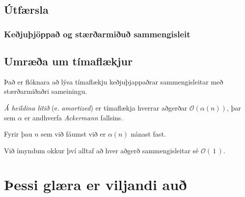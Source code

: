 \subsection{Útfærsla}
{
	\frametitle{Keðjuþjöppað og stærðarmiðuð sammengisleit}
}

\subsection{Umræða um tímaflækjur}
{
	{
		\item<1-> Það er flóknara að lýsa tímaflækju keðjuþjappaðrar sammengisleitar með stærðarmiðaðri sameiningu.
		\item<2-> \emph{Á heildina litið} (e. \emph{amortized}) er tímaflækja hverrar aðgerðar $\mathcal{O}(\alpha(n))$,
					þar sem $\alpha$ er andhverfa \emph{Ackermann} fallsins.
		\item<3-> Fyrir þau $n$ sem við fáumst við er $\alpha(n)$ nánast fast.
		\item<4-> Við ímyndum okkur því alltaf að hver aðgerð sammengisleitar sé $\mathcal{O}(\,1\,)$.
	}
}

\section{Þessi glæra er viljandi auð}
{
}



